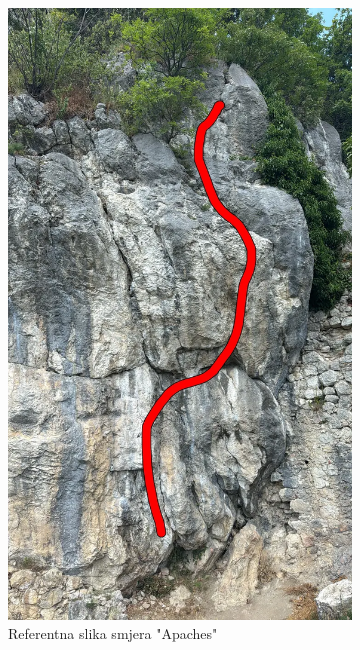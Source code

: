 \begin{figure}[H]
    \centering
    \begin{subfigure}[b]{0.45\textwidth}
        \centering
        \includegraphics[width=\textwidth]{images/testiranje/apaches_ref_slika.png}
        \caption{Referentna slika smjera "Apaches"}
        \label{fig:apaches}
    \end{subfigure}
    \hfill
    \begin{subfigure}[b]{0.45\textwidth}
        \centering

\end{subfigure}
\end{figure}

